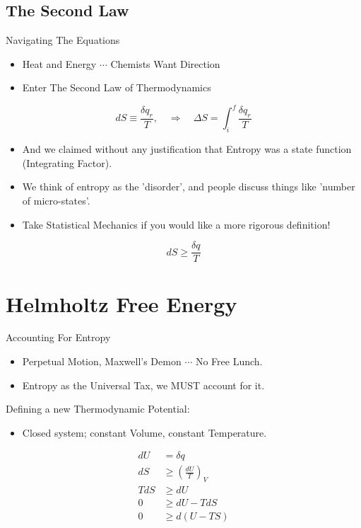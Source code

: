 \documentclass[t,10pt,mathserif,xcolor=pst,pdftex]{beamer}
\newcommand{\be}{\begin{equation}}
\newcommand{\ee}{\end{equation}}
\begin{document}
\subsection{The Second Law}

\begin{frame}{Navigating The Equations}
\begin{itemize}
\item Heat and Energy $\cdots$ Chemists Want Direction
\item Enter The Second Law of Thermodynamics
\end{itemize}
\be
dS \equiv \frac{\delta q_r}{T}, \quad \Rightarrow \quad \Delta S = \int_i^f \frac{\delta q_r}{T}
\ee

\begin{itemize}
\item And we claimed without any justification that Entropy was a state function (Integrating Factor). 
\end{itemize}

\begin{itemize}
\item We think of entropy as the 'disorder', and people discuss things like 'number of micro-states'.
\item Take Statistical Mechanics if you would like a more rigorous definition!
\end{itemize}
\be
dS \geq \frac{\delta q}{T}
\ee

\end{frame}

\section{Helmholtz Free Energy}

\begin{frame}{Accounting For Entropy}

\begin{itemize}
\item Perpetual Motion, Maxwell's Demon $\cdots$ No Free Lunch.
\end{itemize}

\begin{itemize}
\item Entropy as the Universal Tax, we MUST account for it.
\end{itemize}

\hfill \break
{\Large{Defining a new Thermodynamic Potential:}} 
\newline
\begin{itemize}
\item Closed system; constant Volume, constant Temperature. 
\end{itemize}
\be
\begin{split}
    dU &= \delta q \\
    dS &\geq \left(\frac{dU}{T}\right)_V\\
    TdS &\geq dU \\
    0 &\geq dU - TdS\\
    0 &\geq d(U - TS)\\
    \end{split}
\ee

\end{frame}
\end{document}
